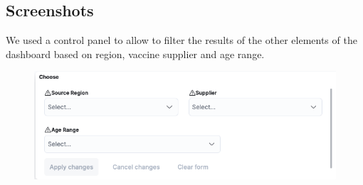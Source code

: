 \documentclass[12pt, a4paper]{article}
\begin{document}
\subsection{Screenshots}
We used a control panel to allow to filter the results of the other elements of the 
dashboard based on region, vaccine supplier and age range.
\begin{figure}[ht]
  \centering
  \includegraphics[width=.9\linewidth]{img (2).png}
\end{figure}
\end{document}
